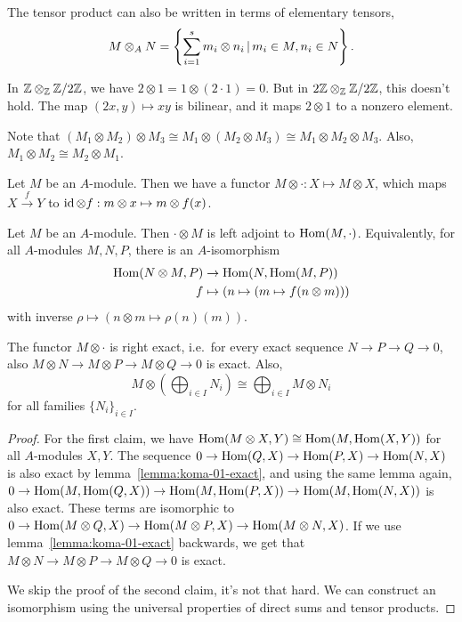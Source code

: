 \begin{remark}
  The tensor product can also be written in terms of elementary tensors,
  \[
	M \otimes_A N = \left\{ \sum_{i=1}^s m_i \otimes n_i \,|\, m_i \in M, n_i
	  \in N \right\}.
  \]
\end{remark}

\begin{example}
  In $\mathbb{Z} \otimes_{\mathbb{Z}} \mathbb{Z} / 2 \mathbb{Z}$, we have $2 \otimes 1 = 1 \otimes (2 \cdot 1) =
  0$.
  But in $2 \mathbb{Z} \otimes_{\mathbb{Z}} \mathbb{Z} / 2 \mathbb{Z}$, this doesn't hold.
  The map $(2x, y) \mapsto xy$ is bilinear, and it maps $2 \otimes 1$ to a
  nonzero element.
\end{example}

\begin{remark}
  Note that $(M_1 \otimes M_2) \otimes M_3 \cong M_1 \otimes (M_2 \otimes M_3)
  \cong M_1 \otimes M_2 \otimes M_3$.
  Also, $M_1 \otimes M_2 \cong M_2 \otimes M_1$.
\end{remark}

Let $M$ be an $A$-module.
Then we have a functor $M \otimes \cdot: X \mapsto M \otimes X$, which maps $X
\xrightarrow{f} Y$ to $\operatorname{id} \otimes f: m \otimes x \mapsto m \otimes f(x)$.

\begin{theorem}
  Let $M$ be an $A$-module.
  Then $\cdot \otimes M$ is left adjoint to $\operatorname{Hom}(M, \cdot)$.
  Equivalently, for all $A$-modules $M, N, P$, there is an $A$-isomorphism
  \begin{align*}
	\operatorname{Hom}(N \otimes M, P) &\to \operatorname{Hom}(N, \operatorname{Hom}(M, P)) \\
	f &\mapsto \left( n \mapsto (m \mapsto f(n \otimes m)) \right)
  \end{align*}
  with inverse $\rho \mapsto \left( n \otimes m \mapsto \rho(n)(m) \right)$.
\end{theorem}

\begin{corollary}
  The functor $M \otimes \cdot$ is right exact, i.e.~for every exact sequence $N
  \to P \to Q \to 0$, also $M \otimes N \to M \otimes P \to M \otimes Q \to 0$
  is exact.
  Also,
  \[
	M \otimes \left( \bigoplus_{i \in I} N_i \right)
	\cong \bigoplus_{i \in I} M \otimes N_i
  \]
  for all families $\{N_i\}_{i \in I}$.
\end{corollary}

\begin{proof}
  For the first claim, we have $\operatorname{Hom}(M \otimes X, Y) \cong \operatorname{Hom}(M, \operatorname{Hom}(X, Y))$
  for all $A$-modules $X, Y$.
  The sequence $0 \to \operatorname{Hom}(Q,X) \to \operatorname{Hom}(P,X) \to \operatorname{Hom}(N,X)$ is also exact by
  lemma~\ref{lemma:koma-01-exact}, and using the same lemma again,
  $0 \to \operatorname{Hom}(M, \operatorname{Hom}(Q, X)) \to \operatorname{Hom}(M, \operatorname{Hom}(P, X)) \to \operatorname{Hom}(M, \operatorname{Hom}(N, X))$
  is also exact.
  These terms are isomorphic to $0 \to \operatorname{Hom}(M \otimes Q, X) \to \operatorname{Hom}(M \otimes
  P, X) \to \operatorname{Hom}(M \otimes N, X)$.
  If we use lemma~\ref{lemma:koma-01-exact} backwards, we get that
  $M \otimes N \to M \otimes P \to M \otimes Q \to 0$ is exact.

  We skip the proof of the second claim, it's not that hard.
  We can construct an isomorphism using the universal properties of direct sums
  and tensor products.
\end{proof}

